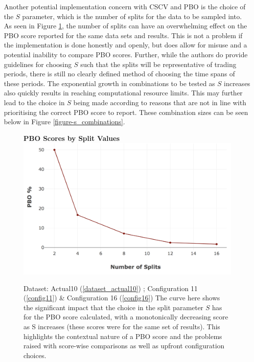 \documentclass[a4paper,11pt,oneside]{article}
\theoremstyle{plain}
\theoremstyle{definition}
\begin{document}
	Another potential implementation concern with CSCV and PBO is the choice of the $S$ parameter, which is the number of splits for the data to be sampled into. As seen in Figure \ref{figure-PBO_by_Split}, the number of splits can have an overwhelming effect on the PBO score reported for the same data sets and results. This is not a problem if the implementation is done honestly and openly, but does allow for misuse and a potential inability to compare PBO scores. Further, while the authors do provide guidelines for choosing $S$ such that the splits will be representative of trading periods, there is still no clearly defined method of choosing the time spans of these periods. The exponential growth in combinations to be tested as $S$ increases also quickly results in reaching computational resource limits. This may further lead to the choice in $S$ being made according to reasons that are not in line with prioritising the correct PBO score to report. These combination sizes can be seen below in Figure \ref{figure-s_combinations}.
	
	\begin{figure}[H]
		\centering 
		\textbf{PBO Scores by Split Values}
		\includegraphics[scale=0.4]{images/results/8_9_pbo/PBO_by_Split.png} 
		\caption[PBO Scores by Split Values]{Dataset: Actual10 (\ref{dataset_actual10}) ; Configuration 11 (\ref{config11}) \&  Configuration 16 (\ref{config16})
			\newline The curve here shows the significant impact that the choice in the split parameter $S$ has for the PBO score calculated, with a monotonically decreasing score as S increases (these scores were for the same set of results). This highlights the contextual nature of a PBO score and the problems raised with score-wise comparisons as well as upfront configuration choices. }
		\label{figure-PBO_by_Split}
	\end{figure}
	
\end{document}
